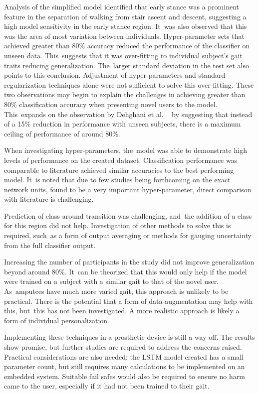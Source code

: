 Analysis of the simplified model identified that early stance was a prominent feature in the separation of walking from stair ascent and descent, suggesting a high model sensitivity in the early stance region. It~was also observed that this was the area of most variation between individuals. Hyper-parameter sets that achieved greater than 80\% accuracy reduced the performance of the classifier on unseen data. This~suggests that it was over-fitting to individual subject's gait traits reducing generalization. The~larger standard deviation in the test set also points to this conclusion. Adjustment of hyper-parameters and standard regularization techniques alone were not sufficient to solve this over-fitting. These two observations may begin to explain the challenges in achieving greater than 80\% classification accuracy when presenting novel users to the model. This~expands on the observation by Dehghani et al. ~\cite{Dehghani2019} by suggesting that instead of a 15\% reduction in performance with unseen subjects, there is a maximum ceiling of performance of around 80\%.

When investigating hyper-parameters, the~model was able to demonstrate high levels of performance on the created dataset. Classification performance was comparable to literature achieved similar accuracies to the best performing model. It~is noted that due to few studies being forthcoming on the exact network units, found to be a very important hyper-parameter, direct comparison with literature is challenging.

Prediction of class around transition was challenging, and~the addition of a class for this region did not help. Investigation of other methods to solve this is required, such~as a form of output averaging or methods for gauging uncertainty from the full classifier output.

Increasing the number of participants in the study did not improve generalization beyond around 80\%. It~can be theorized that this would only help if the model were trained on a subject with a similar gait to that of the novel user. As~amputees have much more varied gait, this approach is unlikely to be practical. There is the potential that a form of data-augmentation may help with this, but~this has not been investigated. A more realistic approach is likely a form of individual personalization.

Implementing these techniques in a prosthetic device is still a way off. The results show promise, but further studies are required to address the concerns raised. Practical considerations are also needed; the LSTM model created has a small parameter count, but still requires many calculations to be implemented on an embedded system. Suitable fail safes would also be required to ensure no harm came to the user, especially if it had not been trained to their gait.

